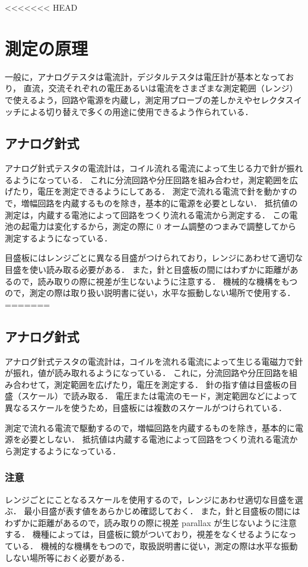 \documentclass[11pt,sort]{jarticle}
\begin{document}
<<<<<<< HEAD
\section{測定の原理}
一般に，アナログテスタは電流計，デジタルテスタは電圧計が基本となっており，
直流，交流それぞれの電圧あるいは電流をさまざまな測定範囲（レンジ）で使えるよう，回路や電源を内蔵し，測定用プローブの差しかえやセレクタスイッチによる切り替えで多くの用途に使用できるよう作られている．

\subsection{アナログ針式}
アナログ針式テスタの電流計は，コイル流れる電流によって生じる力で針が振れるようになっている．
これに分流回路や分圧回路を組み合わせ，測定範囲を広げたり，電圧を測定できるようにしてある．
測定で流れる電流で針を動かすので，増幅回路を内蔵するものを除き，基本的に電源を必要としない．
抵抗値の測定は，内蔵する電池によって回路をつくり流れる電流から測定する．
この電池の起電力は変化するから，測定の際に 0 オーム調整のつまみで調整してから測定するようになっている．

目盛板にはレンジごとに異なる目盛がつけられており，レンジにあわせて適切な目盛を使い読み取る必要がある．
また，針と目盛板の間にはわずかに距離があるので，読み取りの際に視差が生じないように注意する．
機械的な機構をもつので，測定の際は取り扱い説明書に従い，水平な振動しない場所で使用する．
=======
\subsection{アナログ針式}
アナログ針式テスタの電流計は，コイルを流れる電流によって生じる電磁力で針が振れ，値が読み取れるようになっている．
これに，分流回路や分圧回路を組み合わせて，測定範囲を広げたり，電圧を測定する．
針の指す値は目盛板の目盛（スケール）で読み取る．
電圧または電流のモード，測定範囲などによって異なるスケールを使うため，目盛板には複数のスケールがつけられている．

測定で流れる電流で駆動するので，増幅回路を内蔵するものを除き，基本的に電源を必要としない．
抵抗値は内蔵する電池によって回路をつくり流れる電流から測定するようになっている．

\subsubsection*{注意}
レンジごとにことなるスケールを使用するので，レンジにあわせ適切な目盛を選ぶ．
最小目盛が表す値をあらかじめ確認しておく．
また，針と目盛板の間にはわずかに距離があるので，読み取りの際に視差 parallax が生じないように注意する．
機種によっては，目盛板に鏡がついており，視差をなくせるようになっている．
機械的な機構をもつので，取扱説明書に従い，測定の際は水平な振動しない場所等におく必要がある．
\end{document}
